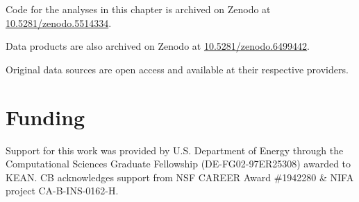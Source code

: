 \documentclass{article}
\begin{document}
Code for the analyses in this chapter is archived on Zenodo at
\href{https://doi.org/10.5281/zenodo.5514334}{10.5281/zenodo.5514334}.

Data products are also archived on Zenodo at
\href{https://doi.org/10.5281/zenodo.6499442}{10.5281/zenodo.6499442}.

Original data sources are open access and available at their respective
providers.

\hypertarget{funding}{%
\section{Funding}\label{funding}}

Support for this work was provided by U.S. Department of Energy through
the Computational Sciences Graduate Fellowship (DE-FG02-97ER25308)
awarded to KEAN. CB acknowledges support from NSF CAREER Award \#1942280
\& NIFA project CA-B-INS-0162-H.



\end{document}
